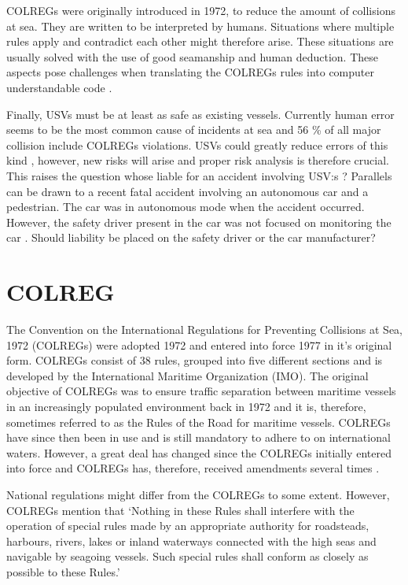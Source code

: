 COLREGs were originally introduced in 1972, to reduce the amount of collisions at sea. They are written to be interpreted by humans. Situations where multiple rules apply and contradict each other might therefore arise. These situations are usually solved with the use of good seamanship and human deduction. These aspects pose challenges when translating the COLREGs rules into computer understandable code \cite{benjamin2006method}.

Finally, USVs must be at least as safe as existing vessels. Currently human error  seems to be the most common cause of incidents at sea \cite{chauvin2011human,roberts2014fatal,uugurlu2015analysis} and 56 \% of all major collision include COLREGs violations\cite{statheros2008autonomous}. USVs could greatly reduce errors of this kind , however, new risks will arise and proper risk analysis is therefore crucial. This raises the question whose liable for an accident involving USV:s \cite{jokioinen2016remote}? Parallels can be drawn to a recent fatal accident involving an autonomous car and a pedestrian. The car was in autonomous mode when the accident occurred. However, the safety driver present in the car was not focused on monitoring the car \cite{uber_accident_liab}. Should liability be placed on the safety driver or the car manufacturer?

\chapter{COLREG}
\label{sec_colreg}
The Convention on the International Regulations for Preventing Collisions at Sea, 1972 (COLREGs) were adopted 1972 and entered into force 1977 in it's original form. COLREGs consist of 38 rules, grouped into five different sections and is developed by the International Maritime Organization (IMO).
The original objective of COLREGs was to ensure traffic separation between maritime vessels in an increasingly populated environment back in 1972 and it is, therefore, sometimes referred to as the Rules of the Road for maritime vessels. COLREGs have since then been in use and is still mandatory to adhere to on international waters. However, a great deal has changed since the COLREGs initially entered into force and COLREGs has, therefore,
received amendments several times \cite{colreg_about_imo}.

National regulations might differ from the COLREGs to some extent. However, COLREGs mention that ‘Nothing in these Rules shall interfere with the operation of special rules made by an appropriate authority for roadsteads, harbours, rivers, lakes or inland waterways connected with the high seas and navigable by seagoing vessels.
Such special rules shall conform as closely as possible to these Rules.’ \cite{colreg}

